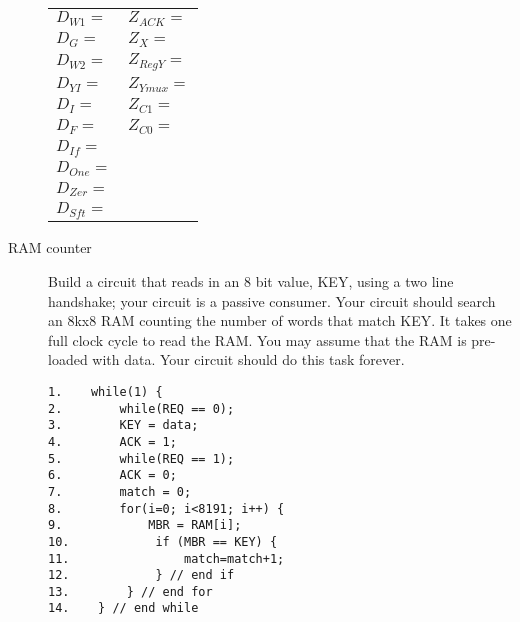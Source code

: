 \begin{description}
\begin{tabular}{p{2in}p{1in}}
$D_{W1} =$	&	$Z_{ACK} =$  		\\
$D_{G} = $	&	$Z_{X} = $		\\
$D_{W2} =$	&	$Z_{RegY} =$  	\\
$D_{YI} =$ 	&	$Z_{Ymux} =$ 		\\
$D_{I} = $	&	$Z_{C1} =$ 		\\
$D_{F} = $	&	$Z_{C0} =$ 		\\
$D_{If} =$ 	&				\\
$D_{One} =$ 	&				\\
$D_{Zer} =$ 	&				\\
$D_{Sft} =$ 	&				\\
\end{tabular}

\pagebreak

\item[RAM counter]
Build a circuit that reads in an 8 bit value, KEY, using a two
line handshake; your circuit is a passive consumer.
Your circuit should search an 8kx8 RAM counting the number
of words that match KEY.  It takes one full clock cycle
to read the RAM.  You may assume that the RAM is pre-loaded
with data.  Your circuit should do this task forever.


\begin{verbatim}
1.    while(1) {
2.        while(REQ == 0);
3.        KEY = data;
4.        ACK = 1;
5.        while(REQ == 1);
6.        ACK = 0;
7.        match = 0;
8.        for(i=0; i<8191; i++) {
9.            MBR = RAM[i]; 
10.            if (MBR == KEY) {
11.                match=match+1;
12.            } // end if
13.        } // end for 
14.    } // end while
\end{verbatim}



\end{description}
